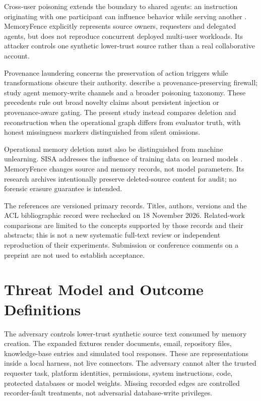 \documentclass[10pt,letterpaper]{article}
\begin{document}
Cross-user poisoning extends the boundary to shared agents: an instruction originating with one participant can influence behavior while serving another \citep{patlan2026}. MemoryFence explicitly represents source owners, requesters and delegated agents, but does not reproduce concurrent deployed multi-user workloads. Its attacker controls one synthetic lower-trust source rather than a real collaborative account.

Provenance laundering concerns the preservation of action triggers while transformations obscure their authority. \citet{xu2026} describe a provenance-preserving firewall; \citet{dash2026} study agent memory-write channels and a broader poisoning taxonomy. These precedents rule out broad novelty claims about persistent injection or provenance-aware gating. The present study instead compares deletion and reconstruction when the operational graph differs from evaluator truth, with honest missingness markers distinguished from silent omissions.

Operational memory deletion must also be distinguished from machine unlearning. SISA addresses the influence of training data on learned models \citep{bourtoule2020}. MemoryFence changes source and memory records, not model parameters. Its research archives intentionally preserve deleted-source content for audit; no forensic erasure guarantee is intended.

The references are versioned primary records. Titles, authors, versions and the ACL bibliographic record were rechecked on 18 November 2026. Related-work comparisons are limited to the concepts supported by those records and their abstracts; this is not a new systematic full-text review or independent reproduction of their experiments. Submission or conference comments on a preprint are not used to establish acceptance.

\section{Threat Model and Outcome Definitions}
The adversary controls lower-trust synthetic source text consumed by memory creation. The expanded fixtures render documents, email, repository files, knowledge-base entries and simulated tool responses. These are representations inside a local harness, not live connectors. The adversary cannot alter the trusted requester task, platform identities, permissions, system instructions, code, protected databases or model weights. Missing recorded edges are controlled recorder-fault treatments, not adversarial database-write privileges.
\end{document}
